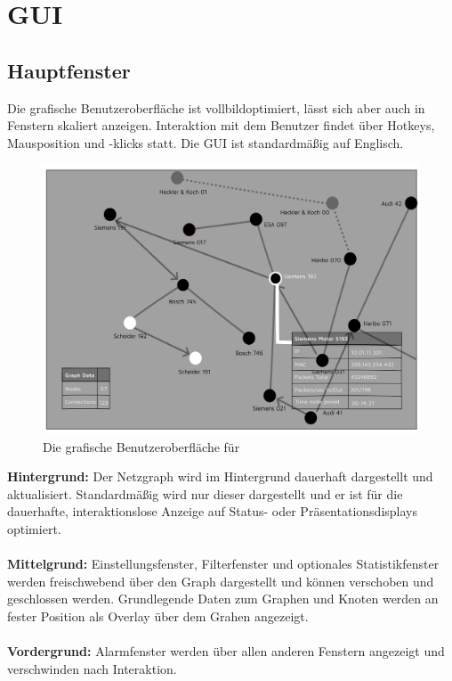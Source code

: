 \chapter{GUI}

\section{Hauptfenster}
Die grafische Benutzeroberfläche ist vollbildoptimiert, lässt sich aber auch in
Fenstern skaliert anzeigen. Interaktion mit dem Benutzer findet über Hotkeys,
Mausposition und -klicks statt.
Die GUI ist standardmäßig auf Englisch.

  \begin{figure}[h!]
    \hspace*{0.15cm}\includegraphics[scale=0.07]{./img/GUI.png}
    \caption{Die grafische Benutzeroberfläche für \programname}
  \end{figure}

\noindent \textbf{Hintergrund:} Der Netzgraph wird im Hintergrund dauerhaft dargestellt und
aktualisiert. Standardmäßig wird nur dieser dargestellt und er ist für die
dauerhafte, interaktionslose Anzeige auf Status- oder Präsentationsdisplays
optimiert.
\\ \\
\textbf{Mittelgrund:} Einstellungsfenster, Filterfenster und optionales Statistikfenster
werden freischwebend über den Graph dargestellt und können verschoben und
geschlossen werden. Grundlegende Daten zum Graphen und Knoten werden an fester
Position als Overlay über dem Grahen angezeigt.
\\ \\
\textbf{Vordergrund:} Alarmfenster werden über allen anderen Fenstern angezeigt und
verschwinden nach Interaktion.


